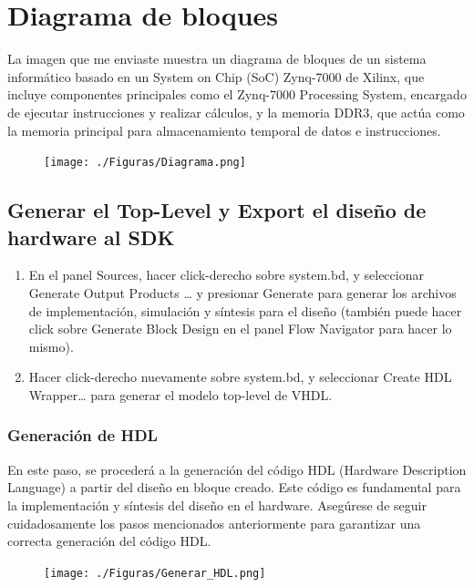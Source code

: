 \documentclass[12pt,a4paper, twoside]{article} %
\begin{document}
\section{Diagrama de bloques }

La imagen que me enviaste muestra un diagrama de bloques de un sistema informático basado en un System on Chip (SoC) Zynq-7000 de Xilinx, que incluye componentes principales como el Zynq-7000 Processing System, encargado de ejecutar instrucciones y realizar cálculos, y la memoria DDR3, que actúa como la memoria principal para almacenamiento temporal de datos e instrucciones.

\begin{figure}[ht]
\centering
\texttt{[image: ./Figuras/Diagrama.png]}
\label{fig:Diagrama de bloques}
\end{figure}


\subsection{Generar el Top-Level y Export el diseño de hardware al SDK}

\begin{enumerate}
    \item En el panel Sources, hacer click-derecho sobre system.bd, y seleccionar Generate Output Products … y presionar Generate para generar los archivos de implementación, simulación y síntesis para el diseño (también puede hacer click sobre Generate Block Design en el panel Flow Navigator para hacer lo mismo).
    \item Hacer click-derecho nuevamente sobre system.bd, y seleccionar Create HDL Wrapper… para generar el modelo top-level de VHDL.
    
\end{enumerate}

\subsubsection{Generación de HDL}

En este paso, se procederá a la generación del código HDL (Hardware Description Language) a partir del diseño en bloque creado. Este código es fundamental para la implementación y síntesis del diseño en el hardware. Asegúrese de seguir cuidadosamente los pasos mencionados anteriormente para garantizar una correcta generación del código HDL.

\begin{figure}[ht]
\centering
\texttt{[image: ./Figuras/Generar\_HDL.png]}
\label{fig:Generar HDL}
\end{figure}
\end{document}
